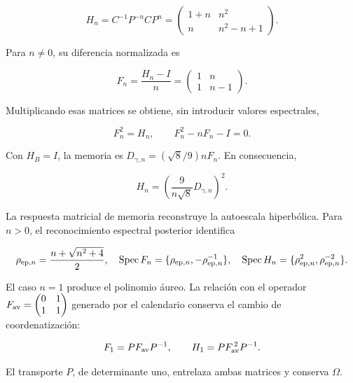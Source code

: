\begin{equation}
H_n=C^{-1}P^{-n}CP^n
=\begin{pmatrix}1+n&n^2\\n&n^2-n+1\end{pmatrix}.
\label{md:antmem:matriz:eq:28}
\end{equation}

Para \(n\ne0\), su diferencia normalizada es

\[
F_n=\frac{H_n-I}{n}
=\begin{pmatrix}1&n\\1&n-1\end{pmatrix}.
\]

Multiplicando esas matrices se obtiene, sin introducir valores espectrales,

\begin{equation}
\boxed{F_n^2=H_n,\qquad F_n^2-nF_n-I=0.}
\label{md:antmem:matriz:eq:29}
\end{equation}

Con \(H_B=I\), la memoria es
\(D_{\gamma,n}=(\sqrt8/9)nF_n\).
En consecuencia,

\begin{equation}
\boxed{H_n=\left(\frac9{n\sqrt8}D_{\gamma,n}\right)^2.}
\label{md:antmem:matriz:eq:30}
\end{equation}

La respuesta matricial de memoria reconstruye la autoescala
hiperbólica. Para \(n>0\), el reconocimiento espectral posterior
identifica

\begin{equation}
\rho_{{\rm ep},n}=\frac{n+\sqrt{n^2+4}}2,\quad
\operatorname{Spec}F_n=\{\rho_{{\rm ep},n},-\rho_{{\rm ep},n}^{-1}\},\quad
\operatorname{Spec}H_n=\{\rho_{{\rm ep},n}^2,\rho_{{\rm ep},n}^{-2}\}.
\label{md:antmem:matriz:eq:31}
\end{equation}

El caso \(n=1\) produce el polinomio áureo.
La relación con el operador
\(F_{\rm av}=\begin{pmatrix}0&1\\1&1\end{pmatrix}\)
generado por el calendario conserva el cambio
de coordenatización:

\begin{equation}
F_1=PF_{\rm av}P^{-1},\qquad
H_1=PF_{\rm av}^{\,2}P^{-1}.
\label{md:antmem:matriz:eq:32}
\end{equation}

El transporte \(P\), de determinante uno, entrelaza ambas
matrices y conserva \(\Omega\).

